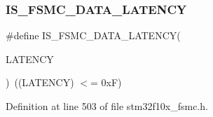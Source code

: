 \subsubsection{\texorpdfstring{I\+S\+\_\+\+F\+S\+M\+C\+\_\+\+D\+A\+T\+A\+\_\+\+L\+A\+T\+E\+N\+CY}{IS\_FSMC\_DATA\_LATENCY}}
{\footnotesize\ttfamily \#define I\+S\+\_\+\+F\+S\+M\+C\+\_\+\+D\+A\+T\+A\+\_\+\+L\+A\+T\+E\+N\+CY(\begin{DoxyParamCaption}\item[{}]{L\+A\+T\+E\+N\+CY }\end{DoxyParamCaption})~((L\+A\+T\+E\+N\+CY) $<$= 0x\+F)}



Definition at line 503 of file stm32f10x\+\_\+fsmc.\+h.

